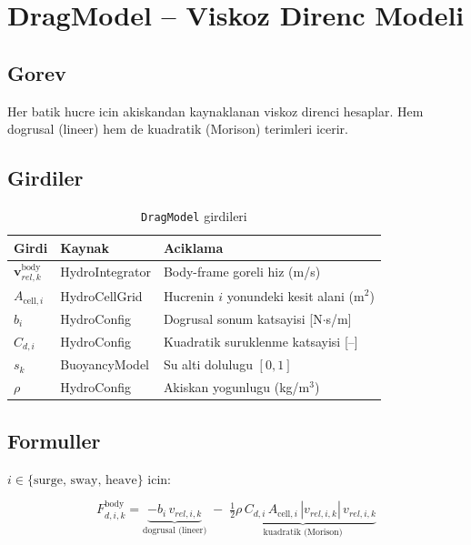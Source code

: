 \documentclass[12pt,a4paper]{article}
\begin{document}
\section{DragModel -- Viskoz Direnc Modeli}

\subsection{Gorev}

Her batik hucre icin akiskandan kaynaklanan viskoz direnci hesaplar.
Hem dogrusal (lineer) hem de kuadratik (Morison) terimleri icerir.

\subsection{Girdiler}

\begin{table}[H]
  \centering
  \caption{\texttt{DragModel} girdileri}
  \begin{tabularx}{\linewidth}{llX}
    \toprule
    \textbf{Girdi} & \textbf{Kaynak} & \textbf{Aciklama} \\
    \midrule
    $\mathbf{v}_{rel,k}^{\text{body}}$ & HydroIntegrator & Body-frame goreli hiz (m/s) \\
    $A_{\text{cell},i}$ & HydroCellGrid & Hucrenin $i$ yonundeki kesit alani (m$^2$) \\
    $b_i$ & HydroConfig & Dogrusal sonum katsayisi [N$\cdot$s/m] \\
    $C_{d,i}$ & HydroConfig & Kuadratik suruklenme katsayisi [--] \\
    $s_k$ & BuoyancyModel & Su alti dolulugu $[0,1]$ \\
    $\rho$ & HydroConfig & Akiskan yogunlugu (kg/m$^3$) \\
    \bottomrule
  \end{tabularx}
\end{table}

\subsection{Formuller}

$i \in \{\text{surge, sway, heave}\}$ icin:

\begin{equation}
  \boxed{
  F_{d,i,k}^{\text{body}}
    = \underbrace{-b_i\,v_{rel,i,k}}_{\text{dogrusal (lineer)}}
    \;-\;
    \underbrace{\tfrac{1}{2}\rho\,C_{d,i}\,A_{\text{cell},i}\,
      |v_{rel,i,k}|\,v_{rel,i,k}}_{\text{kuadratik (Morison)}}
  }
  \label{eq:drag}
\end{equation}
\end{document}
